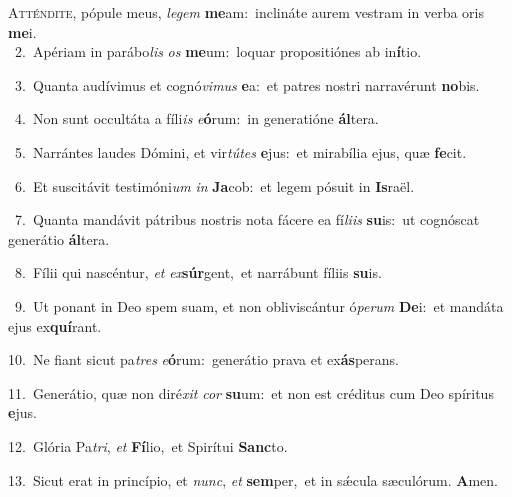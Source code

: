 \lettrine{\initial\textcolor{\initialcolor}{A}}{tténdite,} pópule meus, \textit{le}\-\textit{gem} \textbf{me}\-am:~\star inclináte aurem vestram in verba oris \textbf{me}\-i.\\
{\numbfont\textcolor{\numbcolor}{~2.}}~Apériam in parábo\textit{lis} \textit{os} \textbf{me}\-um:~\star loquar propositiónes ab in\-\textbf{í}\-tio.\par
{\numbfont\textcolor{\numbcolor}{~3.}}~Quanta audívimus et cognó\-\textit{vi}\-\textit{mus} \textbf{e}\-a:~\star et patres nostri narravérunt \textbf{no}\-bis.\par
{\numbfont\textcolor{\numbcolor}{~4.}}~Non sunt occultáta a fíli\textit{is} \textit{e}\-\textbf{ó}rum:~\star in generatióne \textbf{ál}\-tera.\par
{\numbfont\textcolor{\numbcolor}{~5.}}~Narrántes laudes Dómini, et vir\-\textit{tú}\-\textit{tes} \textbf{e}\-jus:~\star et mirabília ejus, quæ \textbf{fe}\-cit.\par
{\numbfont\textcolor{\numbcolor}{~6.}}~Et suscitávit testimóni\textit{um} \textit{in} \textbf{Ja}\-cob:~\star et legem pósuit in \textbf{Is}\-raël.\par
{\numbfont\textcolor{\numbcolor}{~7.}}~Quanta mandávit pátribus nostris nota fácere ea fí\-\textit{li}\-\textit{is} \textbf{su}\-is:~\star ut cognóscat generátio \textbf{ál}\-tera.\par
{\numbfont\textcolor{\numbcolor}{~8.}}~Fílii qui nascéntur, \textit{et} \textit{ex}\-\textbf{súr}gent,~\star et narrábunt fíliis \textbf{su}\-is.\par
{\numbfont\textcolor{\numbcolor}{~9.}}~Ut ponant in Deo spem suam, et non obliviscántur ó\-\textit{pe}\-\textit{rum} \textbf{De}\-i:~\star et mandáta ejus ex\-\textbf{quí}\-rant.\par
{\numbfont\textcolor{\numbcolor}{10.}}~Ne fiant sicut pa\textit{tres} \textit{e}\-\textbf{ó}rum:~\star generátio prava et ex\-\textbf{ás}\-perans.\par
{\numbfont\textcolor{\numbcolor}{11.}}~Generátio, quæ non diré\textit{xit} \textit{cor} \textbf{su}\-um:~\star et non est créditus cum Deo spíritus \textbf{e}\-jus.\par
{\numbfont\textcolor{\numbcolor}{12.}}~Glória Pa\-\textit{tri}\-, \textit{et} \textbf{Fí}\-lio,~\star et Spirítui \textbf{Sanc}\-to.\par
{\numbfont\textcolor{\numbcolor}{13.}}~Sicut erat in princípio, et \textit{nunc}\-, \textit{et} \textbf{sem}\-per,~\star et in sǽcula sæculórum. \textbf{A}\-men.\par
